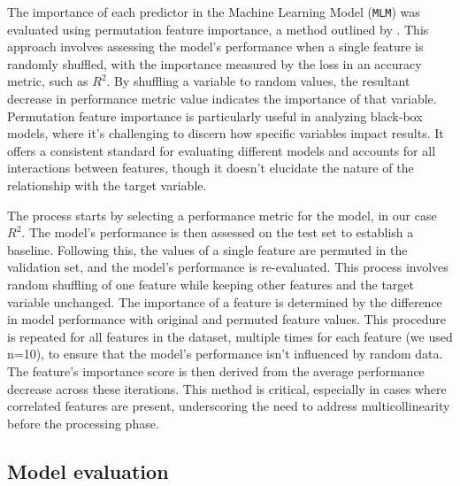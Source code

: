 \documentclass[12pt]{article}
\begin{document}
\par The importance of each predictor in the Machine Learning Model (\texttt{MLM}) was evaluated using permutation feature importance, a method outlined by \cite{altmann2010}. This approach involves assessing the model's performance when a single feature is randomly shuffled, with the importance measured by the loss in an accuracy metric, such as \( R^2 \). By shuffling a variable to random values, the resultant decrease in performance metric value indicates the importance of that variable. Permutation feature importance is particularly useful in analyzing black-box models, where it's challenging to discern how specific variables impact results. It offers a consistent standard for evaluating different models and accounts for all interactions between features, though it doesn't elucidate the nature of the relationship with the target variable.

\par The process starts by selecting a performance metric for the model, in our case \( R^2 \). The model's performance is then assessed on the test set to establish a baseline. Following this, the values of a single feature are permuted in the validation set, and the model's performance is re-evaluated. This process involves random shuffling of one feature while keeping other features and the target variable unchanged. The importance of a feature is determined by the difference in model performance with original and permuted feature values. This procedure is repeated for all features in the dataset, multiple times for each feature (we used n=10), to ensure that the model's performance isn't influenced by random data. The feature's importance score is then derived from the average performance decrease across these iterations. This method is critical, especially in cases where correlated features are present, underscoring the need to address multicollinearity before the processing phase.

\subsection{Model evaluation} \label{sec:methods:eval}
\end{document}
